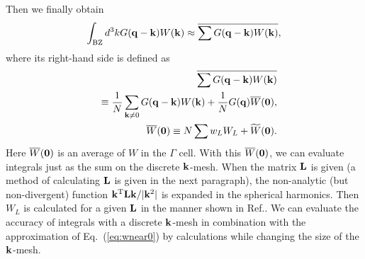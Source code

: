 \documentclass[a4paper,10pt,epsf,fleqn]{article}
\newcommand{\bfzero}{{\bf 0}}
\newcommand{\bfq}{{\bf q}}
\newcommand{\bfk}{{\bf k}}
\newcommand{\req}[1]{\mbox{Eq.~(\ref{#1})}}
\begin{document}
Then we finally obtain
\begin{eqnarray}
\int_{\rm BZ} d^3k G(\bfq-\bfk) W(\bfk) 
\approx \overline{\sum G(\bfq-\bfk) W(\bfk)},\label{eq:bzintbar}
\end{eqnarray}
where its right-hand side is defined as
\begin{eqnarray}
&&\overline{\sum G(\bfq-\bfk) W(\bfk)} \nonumber \\
&&\equiv 
\frac{1}{N} \sum_{\bfk \ne 0} G(\bfq-\bfk) W(\bfk) + \frac{1}{N} G(\bfq)\overline{W}(\bfzero),\\
&&\overline{W}(\bfzero)\equiv N\sum w_L W_L + \widetilde{W}(\bfzero).
\end{eqnarray}
Here $\overline{W}(\bfzero)$ is an %
average of $W$ in the $\Gamma$ cell.
With this $\overline{W}(\bfzero)$, we can 
evaluate integrals just as the sum on the discrete $\bfk$-mesh.
When the matrix ${\bf L}$ is given 
(a method of calculating ${\bf L}$ is given in the next paragraph),
the non-analytic (but non-divergent) function 
${\bfk^{\rm T}{\bf L}\bfk}/|\bfk^2|$ 
is expanded in the spherical harmonics. Then
$W_L$ is calculated for a given ${\bf L}$ in the manner shown in Ref.\cite{friedrich_efficient_2010}. 
We can evaluate the accuracy of integrals with a discrete $\bfk$-mesh
in combination with the approximation of \req{eq:wnear0} 
by calculations while changing the size of the $\bfk$-mesh.




\end{document}
